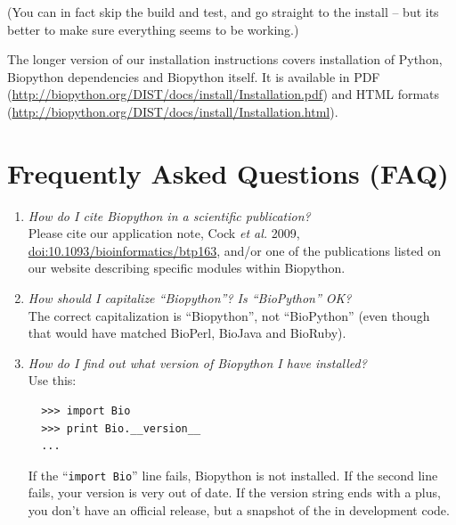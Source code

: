 \documentclass{report}
\begin{document}
\noindent (You can in fact skip the build and test, and go straight to the install --
but its better to make sure everything seems to be working.)

The longer version of our installation instructions covers
installation of Python, Biopython dependencies and Biopython itself.
It is available in PDF
(\url{http://biopython.org/DIST/docs/install/Installation.pdf})
and HTML formats
(\url{http://biopython.org/DIST/docs/install/Installation.html}).

\section{Frequently Asked Questions (FAQ)}

\begin{enumerate}

  \item \emph{How do I cite Biopython in a scientific publication?} \\
  Please cite our application note, Cock \textit{et al.} 2009,
  \href{http://dx.doi.org/10.1093/bioinformatics/btp163}{doi:10.1093/bioinformatics/btp163},
  and/or one of the publications listed on our website describing specific modules within Biopython.

  \item \emph{How should I capitalize ``Biopython''?  Is ``BioPython'' OK?} \\
  The correct capitalization is ``Biopython'', not ``BioPython'' (even though
  that would have matched BioPerl, BioJava and BioRuby).

  \item \emph{How do I find out what version of Biopython I have installed?} \\
  Use this:
  \begin{verbatim}
  >>> import Bio
  >>> print Bio.__version__
  ...
  \end{verbatim}
  If the ``\verb|import Bio|'' line fails, Biopython is not installed.
  If the second line fails, your version is very out of date.
  If the version string ends with a plus, you don't have an official
  release, but a snapshot of the in development code. 


\end{enumerate}
\end{document}
